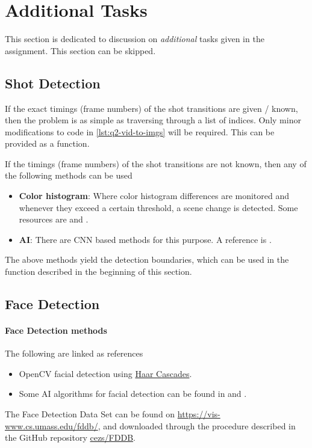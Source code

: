 \section{Additional Tasks}

This section is dedicated to discussion on \emph{additional} tasks given in the assignment. This section can be skipped.

\subsection{Shot Detection}

If the exact timings (frame numbers) of the shot transitions are given / known, then the problem is as simple as traversing through a list of indices. Only minor modifications to code in \ref{lst:q2-vid-to-imgs} will be required. This can be provided as a function.

If the timings (frame numbers) of the shot transitions are not known, then any of the following methods can be used

\begin{itemize}
    \item \textbf{Color histogram}: Where color histogram differences are monitored and whenever they exceed a certain threshold, a scene change is detected. Some resources are \cite{cotsaces2006video} and \cite{mas2003video}.
    \item \textbf{AI}: There are CNN based methods for this purpose. A reference is \cite{7805554}.
\end{itemize}

The above methods yield the detection boundaries, which can be used in the function described in the beginning of this section.

\subsection{Face Detection}

\paragraph{Face Detection methods}
The following are linked as references

\begin{itemize}
    \item OpenCV facial detection using \href{https://docs.opencv.org/4.x/d2/d99/tutorial_js_face_detection.html}{Haar Cascades}.
    \item Some AI algorithms for facial detection can be found in \cite{an2017cnns} and \cite{zafeiriou2015survey}.
\end{itemize}

The Face Detection Data Set can be found on \url{https://vis-www.cs.umass.edu/fddb/}, and downloaded through the procedure described in the GitHub repository \href{https://github.com/cezs/FDDB}{cezs/FDDB}.
